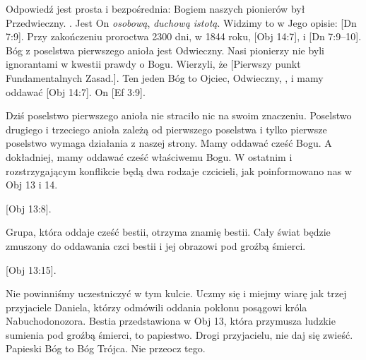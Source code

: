 Odpowiedź jest prosta i bezpośrednia: Bogiem naszych pionierów był Przedwieczny. . Jest On \textit{osobową}, \textit{duchową istotą}. Widzimy to w Jego opisie: [Dn 7:9]. Przy zakończeniu proroctwa 2300 dni, w 1844 roku, [Obj 14:7],  i  [Dn 7:9--10]. Bóg z poselstwa pierwszego anioła jest Odwieczny. Nasi pionierzy nie byli ignorantami w kwestii prawdy o Bogu. Wierzyli, że [Pierwszy punkt Fundamentalnych Zasad.]. Ten jeden Bóg to Ojciec, Odwieczny, , i mamy oddawać [Obj 14:7]. On [Ef 3:9].

Dziś poselstwo pierwszego anioła nie straciło nic na swoim znaczeniu. Poselstwo drugiego i trzeciego anioła zależą od pierwszego poselstwa i tylko pierwsze poselstwo wymaga działania z naszej strony. Mamy oddawać cześć Bogu. A dokładniej, mamy oddawać cześć właściwemu Bogu. W ostatnim i rozstrzygającym konflikcie będą dwa rodzaje czcicieli, jak poinformowano nas w Obj 13 i 14.

[Obj 13:8].

Grupa, która oddaje cześć bestii, otrzyma znamię bestii. Cały świat będzie zmuszony do oddawania czci bestii i jej obrazowi pod groźbą śmierci.

[Obj 13:15].

Nie powinniśmy uczestniczyć w tym kulcie. Uczmy się i miejmy wiarę jak trzej przyjaciele Daniela, którzy odmówili oddania pokłonu posągowi króla Nabuchodonozora. Bestia przedstawiona w Obj 13, która przymusza ludzkie sumienia pod groźbą śmierci, to papiestwo. Drogi przyjacielu, nie daj się zwieść. Papieski Bóg to Bóg Trójca. Nie przeocz tego.

